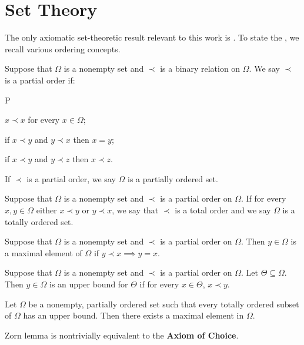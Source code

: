 \section{Set Theory}

The only axiomatic set-theoretic result relevant to this work is .
To state the , we recall various ordering concepts.

\begin{definition}
\label{defn:set:porder}
Suppose that $\Omega$ is a nonempty set and $\prec$ is a binary relation on $\Omega$. We say
$\prec$ is a partial order if:
\begin{axioms}{P}
  \item \label{defn:set:porder:P1} $x \prec x$ for every $x \in \Omega$;
  \item \label{defn:set:porder:P2} if $x \prec y$ and $y \prec x$ then $x = y$;
  \item \label{defn:set:porder:P3} if $x \prec y$ and $y \prec z$ then $x \prec z$.
\end{axioms}
If $\prec$ is a partial order, we say $\Omega$ is a partially ordered set.
\end{definition}
\begin{definition}
\label{defn:set:torder}
Suppose that $\Omega$ is a nonempty set and $\prec$ is a partial order on $\Omega$.
If for every $x, y \in \Omega$ either $x \prec y$ or $y \prec x$, we say that $\prec$ is a total order and we say $\Omega$ is a totally ordered set.
\end{definition}
\begin{definition}
\label{defn:set:maxelem}
Suppose that $\Omega$ is a nonempty set and $\prec$ is a partial order on $\Omega$.
Then $y \in \Omega$ is a maximal element of $\Omega$ if $y \prec x \implies y = x$.
\end{definition}
\begin{definition}
\label{defn:set:upperbnd}
Suppose that $\Omega$ is a nonempty set and $\prec$ is a partial order on $\Omega$.
Let $\Theta \subseteq \Omega$. Then $y \in \Omega$ is an upper bound for $\Theta$
if for every $x \in \Theta$, $x \prec y$.
\end{definition}
\begin{lemma}
\label{lemma:set:zorn}
Let $\Omega$ be a nonempty, partially ordered set such that every totally ordered subset of $\Omega$ has an upper bound. Then there exists a maximal element in $\Omega$. 
\end{lemma}
\begin{remark}
Zorn lemma is nontrivially equivalent to the \textbf{Axiom of Choice}.
\end{remark}